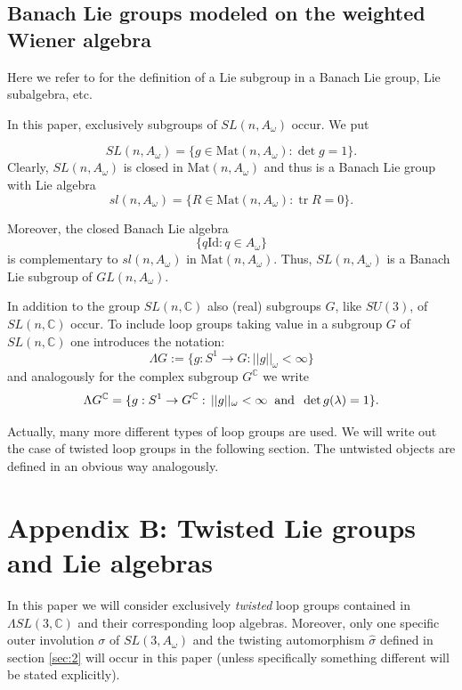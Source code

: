 \documentclass[a4paper,11pt]{amsart}
\theoremstyle{definition}
\numberwithin{equation}{section}
\newcommand{\C}{\mathbb{C}}
\newcommand{\tr}{\operatorname{tr}}
\begin{document}
\subsection{Banach Lie groups modeled on the weighted Wiener algebra}
Here we refer to \cite{Lang} for  the definition of a Lie subgroup in a Banach Lie group, Lie subalgebra, etc. 
 
In this paper, exclusively subgroups of $SL(n, A_\omega)$ occur. We put

$$ SL(n, A_\omega) = \{g \in \mathrm{Mat}(n, A_\omega): \det g = 1 \}.$$
Clearly, $SL(n, A_\omega)$ is closed in $\mathrm{Mat}(n, A_\omega)$  and thus is a Banach Lie group
 with Lie algebra
$$ sl(n, A_\omega) = \{R \in \mathrm{Mat}(n, A_\omega): \tr R = 0 \}.$$

Moreover, the closed Banach Lie algebra 
$$\{ q \mathrm{Id} : q \in A_\omega \}$$
 is complementary to $ sl(n, A_\omega) $ in $\mathrm{Mat}(n, A_\omega)$.
Thus, $ SL(n, A_\omega)$ is a Banach Lie subgroup of $ GL(n, A_\omega)$. 
  
 
In addition to the group $SL(n, \C)$ also (real) subgroups $G$, like $SU(3)$, of $SL(n, \C)$ occur.
 To include loop groups taking value in a subgroup $G$ of $SL(n, \C)$
  one introduces the notation:
  $$\Lambda G := \{ g: S^1\rightarrow G  : ||g||_{\omega} < \infty \}$$
  and analogously  for the complex subgroup  
   $G^\C$
  we write
  $$ \Lambda G^\C = \{ g: S^1\rightarrow G^{\mathbb{C}} : \, ||g||_{\omega} < \infty  
 \hspace{2mm} \mbox{and} \hspace{2mm}  \det g(\lambda) = 1\}. $$
 
 Actually, many more different types of loop
 groups are used.
 We will write out the case of twisted loop groups in the following section.
 The untwisted objects are defined in an obvious way analogously.
 
 
 \section*{Appendix B: Twisted Lie groups and Lie algebras}
 
 In this paper we will consider exclusively \emph{twisted}  loop groups contained in $\Lambda SL(3, \C)$ and 
 their  corresponding loop algebras.
 Moreover, only one specific outer involution $\sigma$ of $ SL(3, A_\omega)$ and the twisting automorphism 
 $\hat{\sigma}$ defined in section \ref{sec:2} 
will occur in this paper (unless specifically something different will be stated explicitly). 
\end{document}
